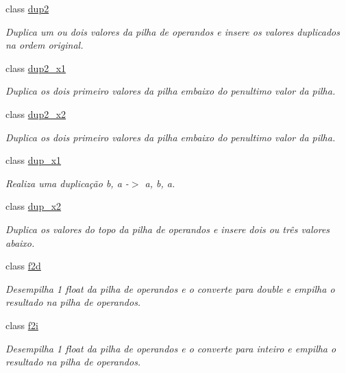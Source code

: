 \begin{DoxyCompactItemize}
class \hyperlink{class_instruction_impl_1_1dup2}{dup2}
\begin{DoxyCompactList}\small\item\em Duplica um ou dois valores da pilha de operandos e insere os valores duplicados na ordem original. \end{DoxyCompactList}\item 
class \hyperlink{class_instruction_impl_1_1dup2__x1}{dup2\+\_\+x1}
\begin{DoxyCompactList}\small\item\em Duplica os dois primeiro valores da pilha embaixo do penultimo valor da pilha. \end{DoxyCompactList}\item 
class \hyperlink{class_instruction_impl_1_1dup2__x2}{dup2\+\_\+x2}
\begin{DoxyCompactList}\small\item\em Duplica os dois primeiro valores da pilha embaixo do penultimo valor da pilha. \end{DoxyCompactList}\item 
class \hyperlink{class_instruction_impl_1_1dup__x1}{dup\+\_\+x1}
\begin{DoxyCompactList}\small\item\em Realiza uma duplicação b, a -\/$>$ a, b, a. \end{DoxyCompactList}\item 
class \hyperlink{class_instruction_impl_1_1dup__x2}{dup\+\_\+x2}
\begin{DoxyCompactList}\small\item\em Duplica os valores do topo da pilha de operandos e insere dois ou três valores abaixo. \end{DoxyCompactList}\item 
class \hyperlink{class_instruction_impl_1_1f2d}{f2d}
\begin{DoxyCompactList}\small\item\em Desempilha 1 float da pilha de operandos e o converte para double e empilha o resultado na pilha de operandos. \end{DoxyCompactList}\item 
class \hyperlink{class_instruction_impl_1_1f2i}{f2i}
\begin{DoxyCompactList}\small\item\em Desempilha 1 float da pilha de operandos e o converte para inteiro e empilha o resultado na pilha de operandos. \end{DoxyCompactList}\item 

\end{DoxyCompactItemize}
